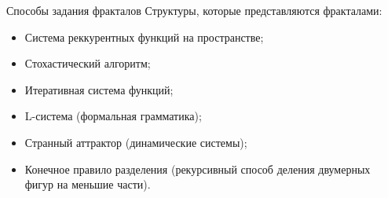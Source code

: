 \documentclass{beamer}
\begin{document}
	\begin{frame}{Способы задания фракталов}
		Структуры, которые представляются фракталами:
		\begin{itemize}
			\item Система реккурентных функций на пространстве;
			\item Стохастический алгоритм;
			\item Итеративная система функций;
			\item L-система (формальная грамматика);
			\item Странный аттрактор (динамические системы);
			\item Конечное правило разделения (рекурсивный способ деления двумерных фигур на меньшие части).
		\end{itemize}

				\note{
					
				}
	\end{frame}
\end{document}
